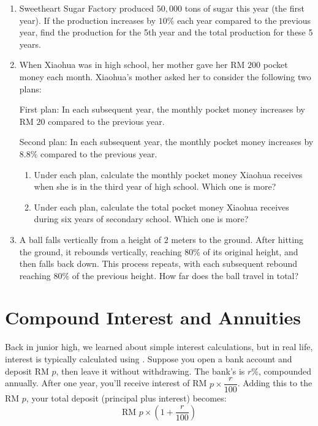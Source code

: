 \documentclass{report}
\begin{document}
\begin{enumerate}
            \item Sweetheart Sugar Factory produced $50,000$ tons of sugar this year (the first year). If the production increases by $10\%$ each year compared to the previous year, find the production for the 5th year and the total production for these 5 years.
            
            \item When Xiaohua was in high school, her mother gave her RM $200$ pocket money each month. Xiaohua's mother asked her to consider the following two plans:
            
            First plan: In each subsequent year, the monthly pocket money increases by RM $20$ compared to the previous year.

            Second plan: In each subsequent year, the monthly pocket money increases by $8.8\%$ compared to the previous year.
            \begin{enumerate}
                \item Under each plan, calculate the monthly pocket money Xiaohua receives when she is in the third year of high school. Which one is more?
                
                \item Under each plan, calculate the total pocket money Xiaohua receives during six years of secondary school. Which one is more?
            \end{enumerate}
            
            \item A ball falls vertically from a height of $2$ meters to the ground. After hitting the ground, it rebounds vertically, reaching $80\%$ of its original height, and then falls back down. This process repeats, with each subsequent rebound reaching $80\%$ of the previous height. How far does the ball travel in total?
        \end{enumerate}

        \section{Compound Interest and Annuities}

        Back in junior high, we learned about simple interest calculations, but in real life, interest is typically calculated using . Suppose you open a bank account and deposit RM $p$, then leave it without withdrawing. The bank's  is $r\%$, compounded annually. After one year, you'll receive interest of RM $p \times \dfrac{r}{100}$. Adding this to the  RM $p$, your total deposit (principal plus interest) becomes:
        $$
        \text{RM } p \times \left(1+\dfrac{r}{100}\right)
        $$
\end{document}
